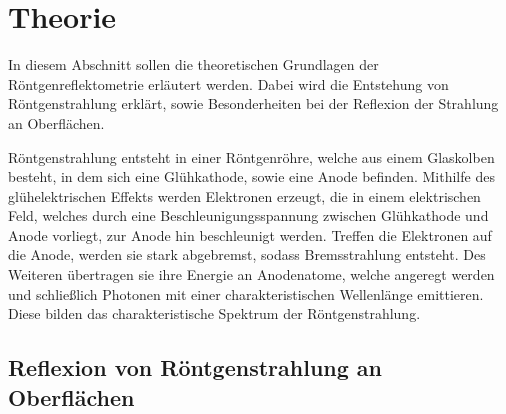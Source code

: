 \section{Theorie}
\label{sec:theorie}

In diesem Abschnitt sollen die theoretischen Grundlagen der Röntgenreflektometrie erläutert werden.
Dabei wird die Entstehung von Röntgenstrahlung erklärt,
sowie Besonderheiten bei der Reflexion der Strahlung an Oberflächen.

Röntgenstrahlung entsteht in einer Röntgenröhre,
welche aus einem Glaskolben besteht,
in dem sich eine Glühkathode,
sowie eine Anode befinden.
Mithilfe des glühelektrischen Effekts werden Elektronen erzeugt,
die in einem elektrischen Feld,
welches durch eine Beschleunigungsspannung zwischen Glühkathode und Anode vorliegt,
zur Anode hin beschleunigt werden.
Treffen die Elektronen auf die Anode,
werden sie stark abgebremst,
sodass Bremsstrahlung entsteht.
Des Weiteren übertragen sie ihre Energie an Anodenatome,
welche angeregt werden und schließlich Photonen mit einer charakteristischen Wellenlänge emittieren.
Diese bilden das charakteristische Spektrum der Röntgenstrahlung.

\subsection{Reflexion von Röntgenstrahlung an Oberflächen}
\label{sec:reflexion_oberflaeche}

